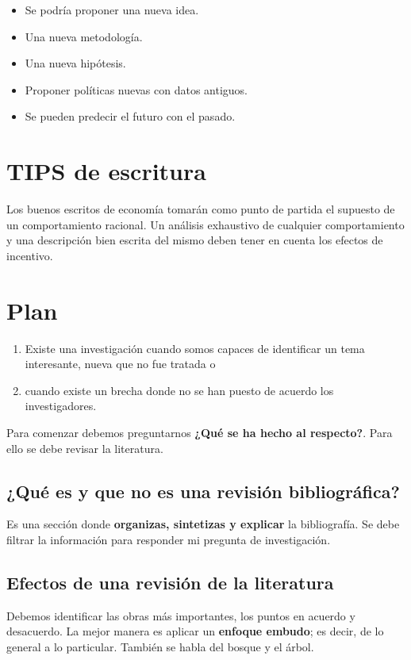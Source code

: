 \begin{itemize}
    \item Se podría proponer una nueva idea.
    \item Una nueva metodología.
    \item Una nueva hipótesis.
    \item Proponer políticas nuevas con datos antiguos.
    \item Se pueden predecir el futuro con el pasado.
\end{itemize}

\section{TIPS de escritura}

Los buenos escritos de economía tomarán como punto de partida el supuesto de un comportamiento racional. Un análisis exhaustivo de cualquier comportamiento y una descripción bien escrita del mismo deben tener en cuenta los efectos de incentivo.


\section{Plan}

\begin{enumerate}[1.]
    \item Existe una investigación cuando somos capaces de identificar un tema interesante, nueva que no fue tratada o
    \item cuando existe un brecha donde no se han puesto de acuerdo los investigadores.
\end{enumerate}

Para comenzar debemos preguntarnos \textbf{¿Qué se ha hecho al respecto?}. Para ello se debe revisar la literatura.


\subsection{¿Qué es y que no es una revisión bibliográfica?}

Es una sección donde \textbf{organizas, sintetizas y explicar} la bibliografía. Se debe filtrar la información para responder mi pregunta de investigación.\\

\subsection{Efectos de una revisión de la literatura}
Debemos identificar las obras más importantes, los puntos en acuerdo y desacuerdo. La mejor manera es aplicar un \textbf{enfoque embudo}; es decir, de lo general a lo particular. También se habla del bosque y el árbol.


